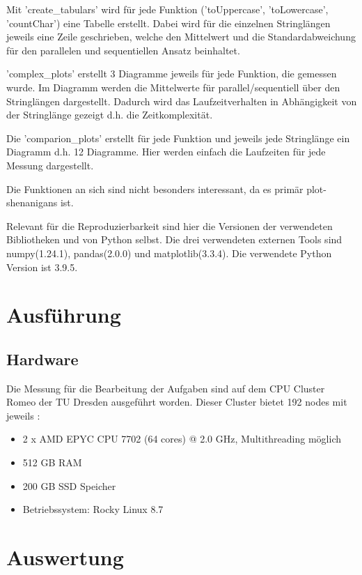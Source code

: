 \documentclass[plainarticle,zihtitle,german,final,hyperref,utf8]{zihpub}
\begin{document}
Mit 'create\_tabulars' wird für jede Funktion ('toUppercase', 'toLowercase', 'countChar') eine Tabelle erstellt. Dabei wird für die einzelnen Stringlängen jeweils eine Zeile geschrieben, welche den Mittelwert und die Standardabweichung für den parallelen und sequentiellen Ansatz beinhaltet.

'complex\_plots' erstellt 3 Diagramme jeweils für jede Funktion, die gemessen wurde. Im Diagramm werden die Mittelwerte für parallel/sequentiell über den Stringlängen dargestellt. Dadurch wird das Laufzeitverhalten in Abhängigkeit von der Stringlänge gezeigt d.h. die Zeitkomplexität.

Die 'comparion\_plots' erstellt für jede Funktion und jeweils jede Stringlänge ein Diagramm d.h. 12 Diagramme.
Hier werden einfach die Laufzeiten für jede Messung dargestellt.

Die Funktionen an sich sind nicht besonders interessant, da es primär plot-shenanigans ist.

Relevant für die Reproduzierbarkeit sind hier die Versionen der verwendeten Bibliotheken und von Python selbst.
Die drei verwendeten externen Tools sind numpy(1.24.1), pandas(2.0.0) und matplotlib(3.3.4). Die verwendete Python Version ist 3.9.5.

\section{Ausführung}
\subsection{Hardware}
Die Messung für die Bearbeitung der Aufgaben sind auf dem CPU Cluster Romeo der TU Dresden ausgeführt worden. Dieser Cluster bietet 192 nodes mit jeweils \cite{hpc_compendium}:
\begin{itemize}
\item 2 x AMD EPYC CPU 7702 (64 cores) @ 2.0 GHz, Multithreading möglich \\
\item 512 GB RAM \\
\item 200 GB SSD Speicher \\
\item Betriebssystem: Rocky Linux 8.7 \\
\end{itemize}


\section{Auswertung}
\end{document}
